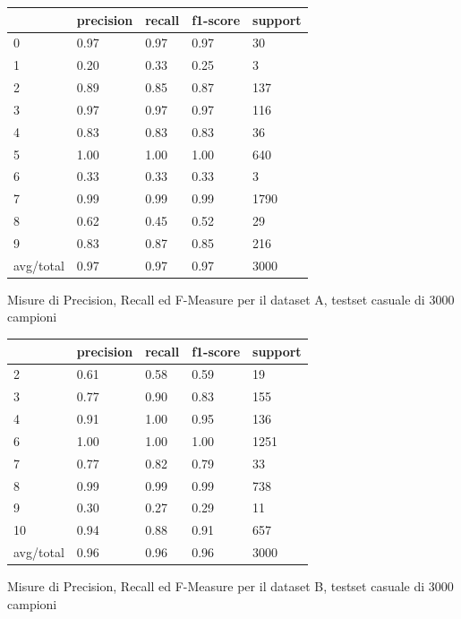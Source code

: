 \documentclass[10pt,a4paper]{article}
\begin{document}
	
	\begin{table}[!htbp]
    \scriptsize
    \centering
    	\begin{tabularx}{0.56\textwidth}{l | llll}
    		{} & {precision} & {recall} & {f1-score} & {support} \\
    		\midrule
            {0} & {0.97} & {0.97} & {0.97} & {30} \\
            {1} & {0.20} & {0.33} & {0.25} & {3} \\
            {2} & {0.89} & {0.85} & {0.87} & {137} \\
            {3} & {0.97} & {0.97} & {0.97} & {116} \\
            {4} & {0.83} & {0.83} & {0.83} & {36} \\
            {5} & {1.00} & {1.00} & {1.00} & {640} \\
            {6} & {0.33} & {0.33} & {0.33} & {3} \\
            {7} & {0.99} & {0.99} & {0.99} & {1790} \\
            {8} & {0.62} & {0.45} & {0.52} & {29} \\
            {9} & {0.83} & {0.87} & {0.85} & {216} \\
            {avg/total} & {0.97} & {0.97} & {0.97} & {3000} \\
    	\end{tabularx}
    	 {Misure di Precision, Recall ed F-Measure per il dataset A, testset casuale di 3000 campioni}
    	\label{tab:a_3ks}
    \end{table}
    
	\begin{table}[!htbp]
    \scriptsize
    \centering
    	\begin{tabularx}{0.56\textwidth}{l | llll}
    		{} & {precision} & {recall} & {f1-score} & {support} \\
    		\midrule
            {2} & {0.61} & {0.58} & {0.59} & {19} \\
            {3} & {0.77} & {0.90} & {0.83} & {155} \\
            {4} & {0.91} & {1.00} & {0.95} & {136} \\
            {6} & {1.00} & {1.00} & {1.00} & {1251} \\
            {7} & {0.77} & {0.82} & {0.79} & {33} \\
            {8} & {0.99} & {0.99} & {0.99} & {738} \\
            {9} & {0.30} & {0.27} & {0.29} & {11} \\
            {10} & {0.94} & {0.88} & {0.91} & {657} \\
            {avg/total} & {0.96} & {0.96} & {0.96} & {3000} \\
    	\end{tabularx}
    	 {Misure di Precision, Recall ed F-Measure per il dataset B, testset casuale di 3000 campioni}
    	\label{tab:b_3ks}
    \end{table}
\end{document}
